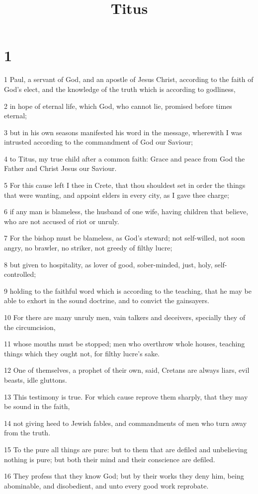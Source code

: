

\title{Titus}

\chapter{1}

\par 1 Paul, a servant of God, and an apostle of Jesus Christ, according to the faith of God's elect, and the knowledge of the truth which is according to godliness,
\par 2 in hope of eternal life, which God, who cannot lie, promised before times eternal;
\par 3 but in his own seasons manifested his word in the message, wherewith I was intrusted according to the commandment of God our Saviour;
\par 4 to Titus, my true child after a common faith: Grace and peace from God the Father and Christ Jesus our Saviour.
\par 5 For this cause left I thee in Crete, that thou shouldest set in order the things that were wanting, and appoint elders in every city, as I gave thee charge;
\par 6 if any man is blameless, the husband of one wife, having children that believe, who are not accused of riot or unruly.
\par 7 For the bishop must be blameless, as God's steward; not self-willed, not soon angry, no brawler, no striker, not greedy of filthy lucre;
\par 8 but given to hospitality, as lover of good, sober-minded, just, holy, self-controlled;
\par 9 holding to the faithful word which is according to the teaching, that he may be able to exhort in the sound doctrine, and to convict the gainsayers.
\par 10 For there are many unruly men, vain talkers and deceivers, specially they of the circumcision,
\par 11 whose mouths must be stopped; men who overthrow whole houses, teaching things which they ought not, for filthy lucre's sake.
\par 12 One of themselves, a prophet of their own, said, Cretans are always liars, evil beasts, idle gluttons.
\par 13 This testimony is true. For which cause reprove them sharply, that they may be sound in the faith,
\par 14 not giving heed to Jewish fables, and commandments of men who turn away from the truth.
\par 15 To the pure all things are pure: but to them that are defiled and unbelieving nothing is pure; but both their mind and their conscience are defiled.
\par 16 They profess that they know God; but by their works they deny him, being abominable, and disobedient, and unto every good work reprobate.

